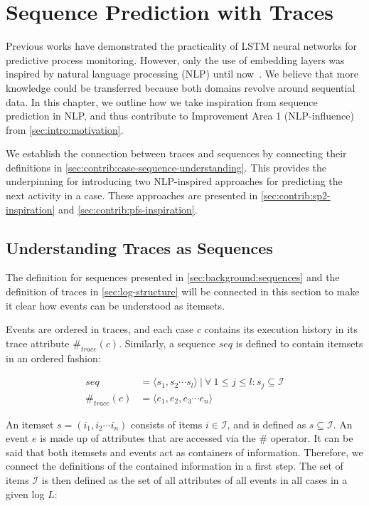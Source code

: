 \chapter{Sequence Prediction with Traces}
\label{chap:taking-inspiration}
Previous works have demonstrated the practicality of LSTM neural networks for predictive process monitoring. However, only the use of embedding layers was inspired by natural language processing (NLP) until now~\cite{evermann2016}. We believe that more knowledge could be transferred because both domains revolve around sequential data. In this chapter, we outline how we take inspiration from sequence prediction in NLP, and thus contribute to Improvement Area 1 (NLP-influence) from \autoref{sec:intro:motivation}.

We establish the connection between traces and sequences by connecting their definitions in \autoref{sec:contrib:case-sequence-understanding}. This provides the underpinning for introducing two NLP-inspired approaches for predicting the next activity in a case. These approaches are presented in \autoref{sec:contrib:sp2-inspiration} and \autoref{sec:contrib:pfs-inspiration}.

\section{Understanding Traces as Sequences}\label{sec:contrib:case-sequence-understanding}
The definition for sequences presented in \autoref{sec:background:sequences} and the definition of traces in \autoref{sec:log-structure} will be connected in this section to make it clear how events can be understood as itemsets.

Events are ordered in traces, and each case $c$ contains its execution history in its trace attribute $\#_{trace}(c)$.
Similarly, a sequence $seq$ is defined to contain itemsets in an ordered fashion:

\begin{equation*}
\begin{split}
seq           &=  \langle s_1,s_2\cdots s_l \rangle\ |\ \forall\ 1 \leq j \leq l: s_j \subseteq \mathscr{I}\\
\#_{trace}(c) &= \langle e_1, e_2, e_3\cdots e_n \rangle
\end{split}
\end{equation*}

An itemset $s = (i_1, i_2 \cdots i_n)$ consists of items $i \in \mathscr{I}$, and is defined as $s \subseteq \mathscr{I}$.
An event $e$ is made up of attributes that are accessed via the $\#$ operator.
It can be said that both itemsets and events act as containers of information.
Therefore, we connect the definitions of the contained information in a first step.
The set of items $\mathscr{I}$ is then defined as the set of all attributes of all events in all cases in a given log $L$:

